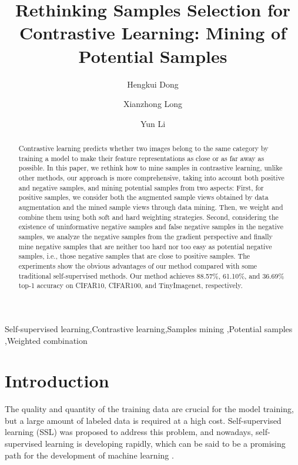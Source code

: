 \documentclass[review]{elsarticle}
\begin{document}
\begin{frontmatter}

\title{Rethinking Samples Selection for Contrastive Learning: Mining of Potential Samples}

\author{Hengkui Dong}
\author{Xianzhong Long}

\author{Yun Li}

\address{School of Computer Science $\&$ Technology, School of Software \\ Nanjing University of Posts and Telecommunications, Nanjing, China, 210023}


\begin{abstract}
Contrastive learning predicts whether two images belong to the same category by training a model to make their feature representations as close or as far away as possible. In this paper, we rethink how to mine samples in contrastive learning, unlike other methods, our approach is more comprehensive, taking into account both positive and negative samples, and mining potential samples from two aspects: First, for positive samples, we consider both the augmented sample views obtained by data augmentation and the mined sample views through data mining. Then, we weight and combine them using both soft and hard weighting strategies. Second, considering the existence of uninformative negative samples and false negative samples in the negative samples, we analyze the negative samples from the gradient perspective and finally mine negative samples that are neither too hard nor too easy as potential negative samples, i.e., those negative samples that are close to positive samples. The experiments show the obvious advantages of our method compared with some traditional self-supervised methods. Our method achieves 88.57\%, 61.10\%, and 36.69\% top-1 accuracy on CIFAR10, CIFAR100, and TinyImagenet, respectively.
\end{abstract}
\begin{keyword}
Self-supervised learning\sep Contrastive learning\sep Samples mining \sep Potential samples \sep Weighted combination
\end{keyword}

\end{frontmatter}


\section{Introduction}
The quality and quantity of the training data are crucial for the model training, but a large amount of labeled data is required at a high cost. Self-supervised learning (SSL) was proposed to address this problem, and nowadays, self-supervised learning is developing rapidly, which can be said to be a promising path for the development of machine learning \cite{new1}.
\end{document}
